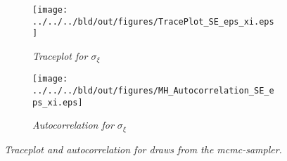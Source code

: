 \begin{figure}[h]
  \begin{subfigure}{.5\textwidth}
    \centering
    \texttt{[image: ../../../bld/out/figures/TracePlot\_SE\_eps\_xi.eps]}
    \caption{\textit{Traceplot for \(\sigma_{\xi}\)}}
    \label{fig:sig_traceplot}
  \end{subfigure}
  \begin{subfigure}{.5\textwidth}
    \centering
    \texttt{[image: ../../../bld/out/figures/MH\_Autocorrelation\_SE\_eps\_xi.eps]}
    \caption{\textit{Autocorrelation for \(\sigma_{\xi}\)}}
    \label{fig:rho_traceplot}
  \end{subfigure}
  \caption{\textit{Traceplot and autocorrelation for draws from the
      mcmc-sampler.}}
  \label{fig:convergence_sig}
\end{figure}